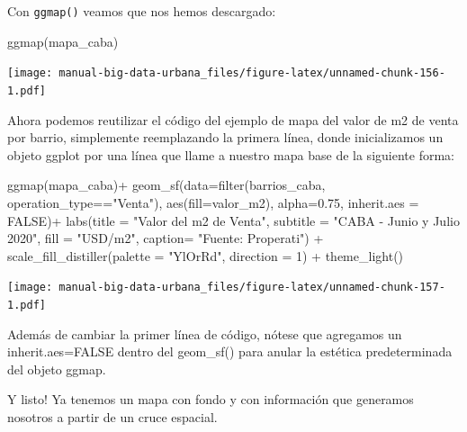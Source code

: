 \documentclass[
  spanish,
]{book}
\newenvironment{Shaded}{\begin{snugshade}}{\end{snugshade}}
\newcommand{\AttributeTok}[1]{\textcolor[rgb]{0.77,0.63,0.00}{#1}}
\newcommand{\ConstantTok}[1]{\textcolor[rgb]{0.00,0.00,0.00}{#1}}
\newcommand{\DecValTok}[1]{\textcolor[rgb]{0.00,0.00,0.81}{#1}}
\newcommand{\FloatTok}[1]{\textcolor[rgb]{0.00,0.00,0.81}{#1}}
\newcommand{\FunctionTok}[1]{\textcolor[rgb]{0.00,0.00,0.00}{#1}}
\newcommand{\NormalTok}[1]{#1}
\newcommand{\SpecialCharTok}[1]{\textcolor[rgb]{0.00,0.00,0.00}{#1}}
\newcommand{\StringTok}[1]{\textcolor[rgb]{0.31,0.60,0.02}{#1}}
\begin{document}
Con \texttt{ggmap()} veamos que nos hemos descargado:

\begin{Shaded}
\begin{Highlighting}[]
\FunctionTok{ggmap}\NormalTok{(mapa\_caba)}
\end{Highlighting}
\end{Shaded}

\texttt{[image: manual-big-data-urbana\_files/figure-latex/unnamed-chunk-156-1.pdf]}

Ahora podemos reutilizar el código del ejemplo de mapa del valor de m2 de venta por barrio, simplemente reemplazando la primera línea, donde inicializamos un objeto ggplot por una línea que llame a nuestro mapa base de la siguiente forma:

\begin{Shaded}
\begin{Highlighting}[]
\FunctionTok{ggmap}\NormalTok{(mapa\_caba)}\SpecialCharTok{+}
  \FunctionTok{geom\_sf}\NormalTok{(}\AttributeTok{data=}\FunctionTok{filter}\NormalTok{(barrios\_caba, operation\_type}\SpecialCharTok{==}\StringTok{"Venta"}\NormalTok{), }\FunctionTok{aes}\NormalTok{(}\AttributeTok{fill=}\NormalTok{valor\_m2), }\AttributeTok{alpha=}\FloatTok{0.75}\NormalTok{, }\AttributeTok{inherit.aes =} \ConstantTok{FALSE}\NormalTok{)}\SpecialCharTok{+}
    \FunctionTok{labs}\NormalTok{(}\AttributeTok{title =} \StringTok{"Valor del m2 de Venta"}\NormalTok{,}
         \AttributeTok{subtitle =} \StringTok{"CABA {-} Junio y Julio 2020"}\NormalTok{,}
         \AttributeTok{fill =} \StringTok{"USD/m2"}\NormalTok{,}
         \AttributeTok{caption=} \StringTok{"Fuente: Properati"}\NormalTok{) }\SpecialCharTok{+}
  \FunctionTok{scale\_fill\_distiller}\NormalTok{(}\AttributeTok{palette =} \StringTok{"YlOrRd"}\NormalTok{, }\AttributeTok{direction =} \DecValTok{1}\NormalTok{) }\SpecialCharTok{+}
  \FunctionTok{theme\_light}\NormalTok{()}
\end{Highlighting}
\end{Shaded}

\texttt{[image: manual-big-data-urbana\_files/figure-latex/unnamed-chunk-157-1.pdf]}

Además de cambiar la primer línea de código, nótese que agregamos un inherit.aes=FALSE dentro del geom\_sf() para anular la estética predeterminada del objeto ggmap.

Y listo! Ya tenemos un mapa con fondo y con información que generamos nosotros a partir de un cruce espacial.

  
\end{document}
